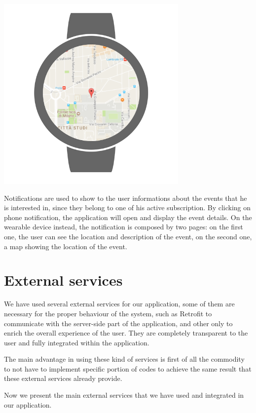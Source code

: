 \documentclass[a4paper]{scrreprt}
\begin{document}
\begin{minipage}{0.33\textwidth}
	\centering
	\includegraphics[width=0.7\textwidth]{notification_wear_map.png}
\end{minipage}
\par\bigskip
Notifications are used to show to the user informations about the events that he is interested in, since they belong to one of his active subscription. By clicking on phone notification, the application will open and display the event details. On the wearable device instead, the notification is composed by two pages: on the first one, the user can see the location and description of the event, on the second one, a map showing the location of the event.

\chapter{External services}
We have used several external services for our application, some of them are necessary for the proper behaviour of the system, such as Retrofit to communicate with the server-side part of the application, and other only to enrich the overall experience of the user. They are completely transparent to the user and fully integrated within the application.
\par The main advantage in using these kind of services is first of all the commodity to not have to implement specific portion of codes to achieve the same result that these external services already provide.
\par Now we present the main external services that we have used and integrated in our application.
\end{document}
